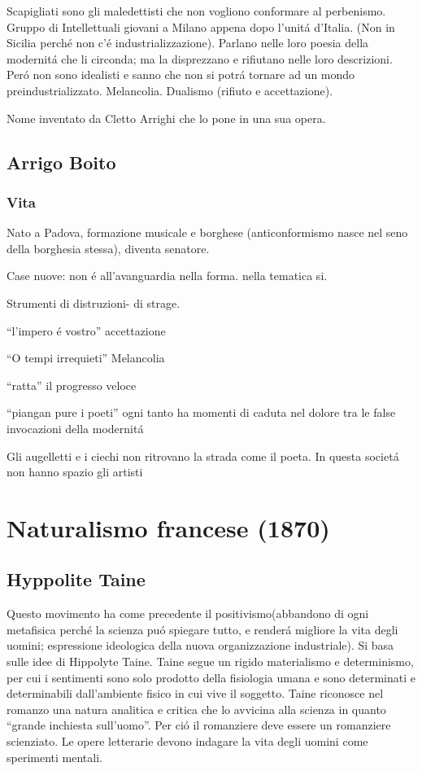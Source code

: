 \documentclass{article}
\begin{document}
Scapigliati sono gli maledettisti che non vogliono conformare al perbenismo. Gruppo di Intellettuali giovani a Milano appena dopo l'unitá d'Italia. (Non in Sicilia perché non c'é industrializzazione). Parlano nelle loro poesia della modernitá che li circonda; ma la disprezzano e rifiutano nelle loro descrizioni. Peró non sono idealisti e sanno che non si potrá tornare ad un mondo preindustrializzato. Melancolia. Dualismo (rifiuto e accettazione).

Nome inventato da Cletto Arrighi che lo pone in una sua opera.

\subsection{Arrigo Boito}
\subsubsection{Vita}
Nato a Padova, formazione musicale e borghese (anticonformismo nasce nel seno della borghesia stessa), diventa senatore.
\begin{center}
Case nuove: non é all'avanguardia nella forma. nella tematica si.

Strumenti di distruzioni- di strage.

``l'impero é vostro'' accettazione

``O tempi irrequieti'' Melancolia

``ratta'' il progresso veloce

``piangan pure i poeti'' ogni tanto ha momenti di caduta nel dolore tra le false invocazioni della modernitá

Gli augelletti e i ciechi non ritrovano la strada come il poeta. In questa societá non hanno spazio gli artisti
\end{center}
\section{Naturalismo francese (1870)}
\subsection{Hyppolite Taine}
Questo movimento ha come precedente il positivismo(abbandono di ogni metafisica perché la scienza puó spiegare tutto, e renderá migliore la vita degli uomini; espressione ideologica della nuova organizzazione industriale). Si basa sulle idee di Hippolyte Taine. Taine segue un rigido materialismo e determinismo, per cui i sentimenti sono solo prodotto della fisiologia umana e sono determinati e determinabili dall'ambiente fisico in cui vive il soggetto. Taine riconosce nel romanzo una natura analitica e critica che lo avvicina alla scienza in quanto ``grande inchiesta sull'uomo''. Per ció il romanziere deve essere un romanziere scienziato. Le opere letterarie devono indagare la vita degli uomini come sperimenti mentali.
\end{document}

